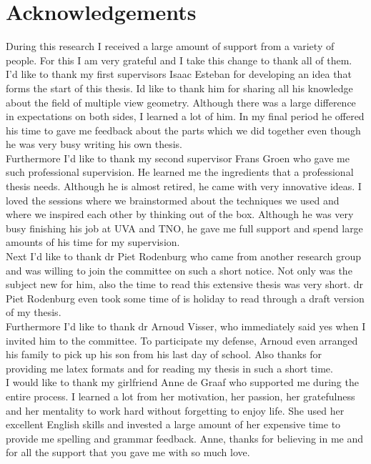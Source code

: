 \section*{Acknowledgements}
During this research I received a large amount of support from a variety
of people. For this I am very grateful and I take this change to thank all of
them.\\

I'd like to thank my first supervisors Isaac Esteban for developing an 
idea that forms the start of this thesis.  Id like to thank him for sharing all his
knowledge about the field of multiple view geometry.  Although there was a large
difference in expectations on both sides, I learned a lot of him.  In my final
period he offered his time to gave me feedback about the parts which we did
together even though he was very busy writing his own thesis.\\

Furthermore I'd like to thank my second supervisor Frans Groen who gave me such professional supervision.  He
learned me the ingredients that a professional thesis needs.
Although he is almost retired, he came with very innovative ideas.  I loved the
sessions where we brainstormed about the techniques we used and where we
inspired each other by thinking out of the box.  Although he was very busy finishing
his job at UVA and TNO, he gave me full support and spend large amounts of his
time for my supervision.\\

Next I'd like to thank dr Piet Rodenburg who came from another research group
and was willing to join the committee on such a short notice.  Not only was the
subject new for him, also the time to
read this extensive thesis was very short.  dr Piet Rodenburg even took some
time of is holiday to read through a draft version of my thesis.\\

Furthermore I'd like to thank dr Arnoud Visser, who immediately said yes when I
invited him to the committee.  To participate my defense, Arnoud even arranged his
family to pick up his son from his last day of school.  Also thanks for
providing me latex formats and for reading my thesis in such a short time.  \\

I would like to thank my girlfriend Anne de Graaf who supported me during the
entire process.  I learned a lot from her motivation, her passion, her
gratefulness and her mentality to work hard without forgetting to enjoy life.
She used her excellent English skills and invested a large amount of her
expensive time to provide me spelling and grammar feedback.  Anne, thanks for
believing in me and for all the support that you gave me with so much love.\\

